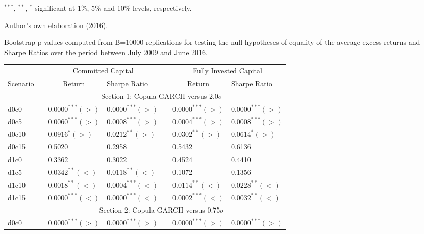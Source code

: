 \documentclass[a4paper,12pt]{report}
\begin{document}
\begin{threeparttable}[H]
\begin{tablenotes}
		\item \scriptsize $^{\ast\ast\ast}$, $^{\ast\ast}$, $^{\ast}$ significant at 1\%, 5\% and 10\% levels, respectively.
		\item Author's own elaboration (2016).
	\end{tablenotes}
	\label{tab:table208}%
\end{threeparttable}%

\vspace{1.0cm}

\begin{threeparttable}[H]
	\centering \scriptsize
	\caption{Bootstrap p-values computed from B=10000 replications for testing the null hypotheses of equality of the average excess returns and Sharpe Ratios over the period between July 2009 and June 2016.}
	\begin{tabularx}{\textwidth}{@{\extracolsep{\fill}}lllllll@{}}
		\toprule
		& & \multicolumn{2}{c}{Committed Capital} & \multicolumn{1}{c}{} & \multicolumn{2}{c}{Fully Invested Capital} \\
		\cmidrule{3-4}  \cmidrule{6-7}
		\multicolumn{1}{c}{Scenario} & & \multicolumn{1}{c}{Return} & Sharpe Ratio &       & \multicolumn{1}{c}{Return}& Sharpe Ratio \\
		\midrule
		& \multicolumn{6}{c}{Section 1: Copula-GARCH versus 2.0$\sigma$} \\
		\midrule
		d0c0 & & $0.0000^{***}(>)$ & $0.0000^{***}(>)$ &       & $0.0000^{***}(>)$ & $0.0000^{***}(>)$ \\
		d0c5 & & $0.0060^{***}(>)$ & $0.0008^{***}(>)$ &       & $0.0004^{***}(>)$ & $0.0008^{***}(>)$   \\
		d0c10 & & $0.0916^{*}(>)$ & $0.0212^{**}(>)$ &       & $0.0302^{**}(>)$ & $0.0614^{*}(>)$ \\
		d0c15 & & 0.5020 & 0.2958 &       & 0.5432 & 0.6136 \\
		d1c0 & & 0.3362 & 0.3022  &       & 0.4524 & 0.4410 \\
		d1c5 & & $0.0342^{**}(<)$ & $0.0118^{**}(<)$ &       & 0.1072 & 0.1356 \\
		d1c10 & & $0.0018^{**}(<)$ & $0.0004^{***}(<)$ &       & $0.0114^{**}(<)$ & $0.0228^{**}(<)$ \\
		d1c15 & & $0.0000^{***}(<)$ & $0.0000^{***}(<)$ &       & $0.0002^{***}(<)$ & $0.0032^{**}(<)$ \\
		\midrule
		& \multicolumn{6}{c}{Section 2: Copula-GARCH versus 0.75$\sigma$} \\
		\midrule
		d0c0 & & $0.0000^{***}(>)$ & $0.0000^{***}(>)$ &       & $0.0000^{***}(>)$ & $0.0000^{***}(>)$ \\

\end{tabularx}
\end{threeparttable}
\end{document}
